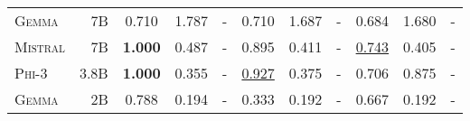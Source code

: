 \begin{table*}[ht]
{\begin{tabular}{lrccccccccc}
            \textsc{Gemma}      & 7B             & 0.710             & 1.787          & -          & 0.710             & 1.687          & -          & 0.684             & 1.680           & -          \\
            \textsc{Mistral}    & 7B             & \textbf{1.000}    & 0.487          & -          & 0.895             & 0.411          & -          & \underline{0.743} & 0.405           & -          \\
            \textsc{Phi-3}      & 3.8B           & \textbf{1.000}    & 0.355          & -          & \underline{0.927} & 0.375          & -          & 0.706             & 0.875           & -          \\
            \textsc{Gemma}      & 2B             & 0.788             & 0.194          & -          & 0.333             & 0.192          & -          & 0.667             & 0.192           & -          \\
            \bottomrule
        \end{tabular}
    }
\end{table*}
